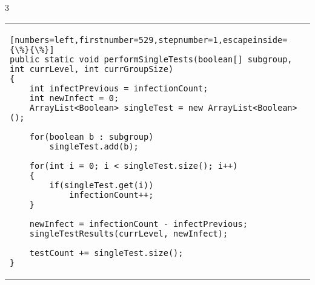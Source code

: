 \documentclass[letterpaper, 10pt,DIV=13]{scrartcl}
\numberwithin{equation}{section} %
\numberwithin{figure}{section} %
\numberwithin{table}{section} %
\begin{document}
3
\begin{center}
\begin{tabular}{l}
\begin{lstlisting}[numbers=left,firstnumber=529,stepnumber=1,escapeinside={\%}{\%}]
public static void performSingleTests(boolean[] subgroup, int currLevel, int currGroupSize)
{
    int infectPrevious = infectionCount;
    int newInfect = 0;
    ArrayList<Boolean> singleTest = new ArrayList<Boolean>();

    for(boolean b : subgroup)
        singleTest.add(b);

    for(int i = 0; i < singleTest.size(); i++)
    {
        if(singleTest.get(i))
            infectionCount++;
    }

    newInfect = infectionCount - infectPrevious;                   
    singleTestResults(currLevel, newInfect);

    testCount += singleTest.size();
}
\end{lstlisting}
\end{tabular}
\end{center}\textbf{}
\end{document}
